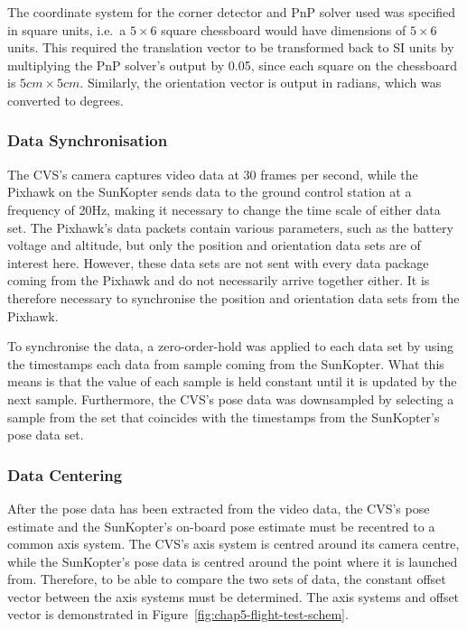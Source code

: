 The coordinate system for the corner detector and PnP solver used was specified in square units, i.e.\ a $5\times6$ square chessboard would have dimensions of $5\times6$ units. This required the translation vector to be transformed back to SI units by multiplying the PnP solver's output by 0.05, since each square on the chessboard is $5cm\times5cm$. Similarly, the orientation vector is output in radians, which was converted to degrees. 

\subsubsection{Data Synchronisation}

The CVS's camera captures video data at 30 frames per second, while the Pixhawk on the SunKopter sends data to the ground control station at a frequency of 20Hz, making it necessary to change the time scale of either data set. The Pixhawk's data packets contain various parameters, such as the battery voltage and altitude, but only the position and orientation data sets are of interest here. However, these data sets are not sent with every data package coming from the Pixhawk and do not necessarily arrive together either. It is therefore necessary to synchronise the position and orientation data sets from the Pixhawk.

To synchronise the data, a zero-order-hold was applied to each data set by using the timestamps each data from sample coming from the SunKopter. What this means is that the value of each sample is held constant until it is updated by the next sample. Furthermore, the CVS's pose data was downsampled by selecting a sample from the set that coincides with the timestamps from the SunKopter's pose data set. 

\subsubsection{Data Centering}
\label{sec:chap5-data-centring}

After the pose data has been extracted from the video data, the CVS's pose estimate and the SunKopter's on-board pose estimate must be recentred to a common axis system. The CVS's axis system is centred around its camera centre, while the SunKopter's pose data is centred around the point where it is launched from. Therefore, to be able to compare the two sets of data, the constant offset vector between the axis systems must be determined. The axis systems and offset vector is demonstrated in Figure~\ref{fig:chap5-flight-test-schem}.

